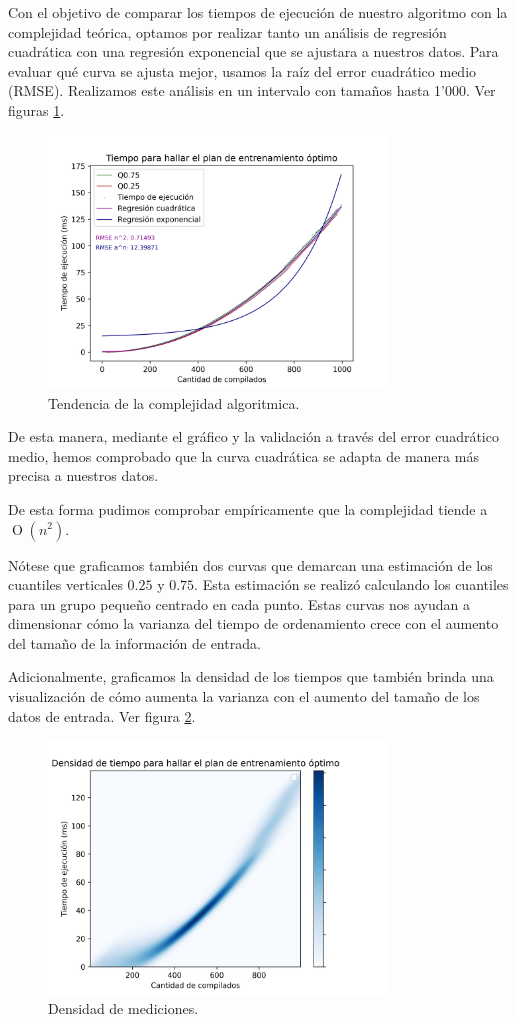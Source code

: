 Con el objetivo de comparar los tiempos de ejecución de nuestro algoritmo con la complejidad teórica, optamos por 
realizar tanto un análisis de regresión cuadrática con una regresión exponencial que se ajustara a nuestros datos.
Para evaluar qué curva se ajusta mejor, usamos la raíz del error cuadrático medio (RMSE). Realizamos este análisis en un
intervalo con tamaños hasta 1'000. Ver figuras \ref{fig:tiempos_puntos}.

\begin{figure}[H]
    \centering
    \includegraphics[width=0.8\textwidth]{img/tiempos_puntos.png}
    \caption{Tendencia de la complejidad algoritmica.}
    \label{fig:tiempos_puntos}
\end{figure}

De esta manera, mediante el gráfico y la validación a través del error cuadrático medio,
hemos comprobado que la curva cuadrática se adapta de manera más precisa a nuestros datos.

De esta forma pudimos comprobar empíricamente que la complejidad tiende a $\operatorname{O}(n^2)$.

Nótese que graficamos también dos curvas que demarcan una estimación de los cuantiles verticales $0.25$ y $0.75$. Esta estimación
se realizó calculando los cuantiles para un grupo pequeño centrado en cada punto. Estas curvas nos ayudan a dimensionar cómo la
varianza del tiempo de ordenamiento crece con el aumento del tamaño de la información de entrada.

Adicionalmente, graficamos la densidad de los tiempos que también brinda una visualización de cómo aumenta la varianza con el aumento del tamaño
de los datos de entrada. Ver figura \ref{fig:tiempos_densidad}. 

\begin{figure}[H]
    \centering
    \includegraphics[width=0.8\textwidth]{img/tiempos_densidad.png}
    \caption{Densidad de mediciones.}
    \label{fig:tiempos_densidad}
\end{figure}
